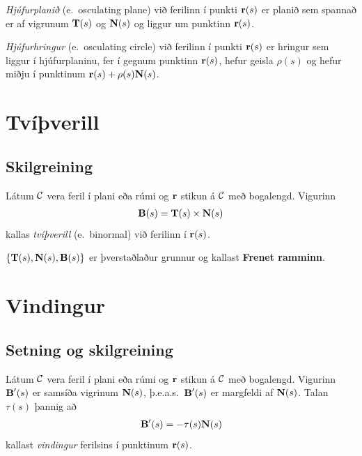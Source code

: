 \documentclass[a4paper,10pt,icelandic]{sphinxmanual}
\begin{document}
\emph{Hjúfurplanið} (e. osculating plane) við ferilinn í punkti
\(\mbox{${\bf r}$}(s)\) er planið sem spannað er af vigrunum
\(\mbox{${\bf T}$}(s)\) og \(\mbox{${\bf N}$}(s)\) og liggur um
punktinn \(\mbox{${\bf r}$}(s)\).

\emph{Hjúfurhringur} (e. osculating circle) við ferilinn í punkti
\(\mbox{${\bf r}$}(s)\) er hringur sem liggur í hjúfurplaninu, fer í
gegnum punktinn \(\mbox{${\bf r}$}(s)\), hefur geisla
\(\rho(s)\) og hefur miðju í punktinum
\(\mbox{${\bf r}$}(s)+\rho(s)\mbox{${\bf N}$}(s)\).


\section{Tvíþverill}
\label{Kafli1:tviverill}

\subsection{Skilgreining}
\label{Kafli1:id18}\label{Kafli1:index-17}
Látum \(\cal C\) vera feril í plani eða rúmi og
\(\mbox{${\bf r}$}\) stikun á \(\cal C\) með bogalengd. Vigurinn
\begin{gather}
\begin{split}\displaystyle \mbox{${\bf B}$}(s)=\mbox{${\bf T}$}(s)\times \mbox{${\bf N}$}(s)\end{split}\notag
\end{gather}
kallas \emph{tvíþverill} (e. binormal) við ferilinn í
\(\mbox{${\bf r}$}(s)\).

\(\{\mbox{${\bf T}$}(s),\mbox{${\bf N}$}(s),\mbox{${\bf B}$}(s)\}\)
er þverstaðlaður grunnur og kallast \textbf{Frenet ramminn}.


\section{Vindingur}
\label{Kafli1:vindingur}

\subsection{Setning og skilgreining}
\label{Kafli1:index-18}\label{Kafli1:setning-og-skilgreining}
Látum \(\cal C\) vera feril í plani eða rúmi og
\(\mbox{${\bf r}$}\) stikun á \(\cal C\) með bogalengd. Vigurinn
\(\mbox{${\bf B}$}'(s)\) er samsíða vigrinum
\(\mbox{${\bf N}$}(s)\), þ.e.a.s. \(\mbox{${\bf B}$}'(s)\) er
margfeldi af \(\mbox{${\bf N}$}(s)\). Talan \(\tau(s)\) þannig
að
\begin{gather}
\begin{split}\displaystyle \mbox{${\bf B}$}'(s)=-\tau(s)\mbox{${\bf N}$}(s)\end{split}\notag
\end{gather}
kallast \emph{vindingur} ferilsins í punktinum \(\mbox{${\bf r}$}(s)\).
\end{document}
